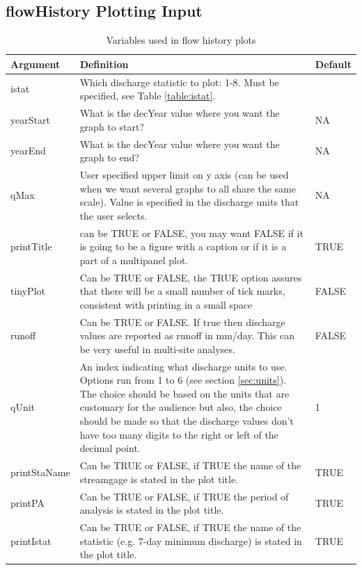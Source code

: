 \documentclass[a4paper,11pt]{article}\usepackage[]{graphicx}\usepackage[]{color}
\begin{document}
\subsection{flowHistory Plotting Input}
\label{sec:flowHistoryVariables}
\begin{table}[ht]
  \centering
  \begin{threeparttable}[b]
\caption{Variables used in flow history plots  \label{tab:flowHistoryVariables}}
\begin{tabularx}{\textwidth}{lXl}
\hline
  \textbf{Argument} & \textbf{Definition} & \textbf{Default} \\
\hline
istat & Which discharge statistic to plot: 1-8.  Must be specified, see Table \ref{table:istat}. & \\
yearStart\tnote{1} & What is the decYear value where you want the graph to start? & NA\\
yearEnd\tnote{1} & What is the decYear value where you want the graph to end? & NA\\
qMax & User specified upper limit on y axis (can be used when we want several graphs to all share the same scale). Value is specified in the discharge units that the user selects. & NA\\
printTitle & can be TRUE or FALSE, you may want FALSE if it is going to be a figure with a caption or if it is a part of a multipanel plot. & TRUE\\
tinyPlot & Can be TRUE or FALSE, the TRUE option assures that there will be a small number of tick marks, consistent with printing in a small space & FALSE\\
runoff & Can be TRUE or FALSE.  If true then discharge values are reported as runoff in mm/day.  This can be very useful in multi-site analyses. & FALSE\\
qUnit & An index indicating what discharge units to use.  Options run from 1 to 6 (see section \ref{sec:units}).  The choice should be based on the units that are customary for the audience but also, the choice should be made so that the discharge values don't have too many digits to the right or left of the decimal point. & 1\\
printStaName\tnote{2} & Can be TRUE or FALSE, if TRUE the name of the streamgage is stated in the plot title. & TRUE\\
printPA\tnote{2} & Can be TRUE or FALSE, if TRUE the period of analysis is stated in the plot title. & TRUE\\
printIstat\tnote{2} & Can be TRUE or FALSE, if TRUE the name of the statistic (e.g. 7-day minimum discharge) is stated in the plot title. & TRUE\\


\end{tabularx}
\end{threeparttable}
\end{table}
\end{document}
